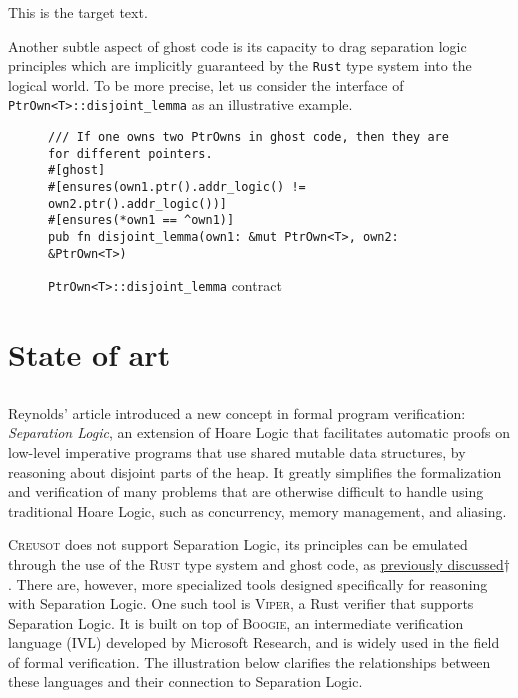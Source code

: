 \documentclass[12pt,a4paper]{report}
\begin{document}

\hypertarget{ghostcode}{This is the target text.}
Another subtle aspect of ghost code is its capacity to drag separation logic principles which are implicitly guaranteed by the \texttt{Rust} type system into the logical world. To be more precise, let us consider the interface of \texttt{PtrOwn<T>::disjoint\_lemma} as an illustrative example.

\begin{figure}[h]
  \centering
  \begin{verbatim}
/// If one owns two PtrOwns in ghost code, then they are for different pointers.
#[ghost]
#[ensures(own1.ptr().addr_logic() != own2.ptr().addr_logic())]
#[ensures(*own1 == ^own1)]
pub fn disjoint_lemma(own1: &mut PtrOwn<T>, own2: &PtrOwn<T>)
  \end{verbatim}
  \caption{\texttt{PtrOwn<T>::disjoint\_lemma} contract}
  \label{fig:disjoint-lemma}
\end{figure}


\chapter{State of art}
\section{}

Reynolds' article introduced a new concept in formal program verification: \emph{Separation Logic}, an extension of Hoare Logic that facilitates automatic proofs on low-level imperative programs that use shared mutable data structures, by reasoning about disjoint parts of the heap. It greatly simplifies the formalization and verification of many problems that are otherwise difficult to handle using traditional Hoare Logic, such as concurrency, memory management, and aliasing.



\textsc{Creusot} does not support Separation Logic, its principles can be emulated through the use of the \textsc{Rust} type system and ghost code, as \hyperlink{ghostcode}{previously discussed$\dagger$}. There are, however, more specialized tools designed specifically for reasoning with Separation Logic. One such tool is \textsc{Viper}, a Rust verifier that supports Separation Logic. It is built on top of \textsc{Boogie}, an intermediate verification language (IVL) developed by Microsoft Research, and is widely used in the field of formal verification. The illustration below clarifies the relationships between these languages and their connection to Separation Logic.
\end{document}
